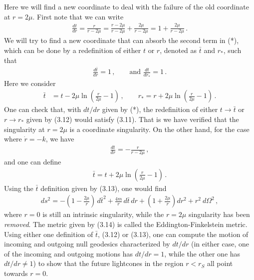 \documentclass[11pt, onesided]{book}
\theoremstyle{break}
\theoremstyle{break}
\begin{document}
Here we will find a new coordinate to deal with the failure of the old coordinate at $r = 2\mu $. First note that we can write
\begin{align*}
\frac{dt}{dr}  = \frac{r}{r-2\mu } = \frac{r-2\mu }{r-2\mu }+\frac{2\mu }{r-2\mu } = 1 + \frac{2\mu }{r- 2\mu }\,. \tag{*}
\end{align*}
We will try to find a new coordinate that can absorb the second term in (*), which can be done by a redefinition of either $t$ or $r$, denoted as $\bar{t}$ and $r_*$, such that
\begin{align}
\frac{d\bar{t}}{dr} = 1\,,\qquad\text{and }\frac{dt}{dr_*} = 1\,.
\end{align} 
Here we consider
\begin{align}
\bar{t} &= t - 2\mu \ln\left( \frac{r}{2\mu } - 1\right) \,,\qquad
r_* = r + 2\mu  \ln\left( \frac{r}{2\mu }-1\right)\,.
\end{align}
One can check that, with $dt/dr$ given by (*), the redefinition of either $t\to \bar{t}$ or $r \to r_*$ given by (3.12) would satisfy (3.11). That is we have verified that the singularity at $r = 2\mu $ is a coordinate singularity. On the other hand, for the case where $\dot{r} = -k$, we have
\begin{align*}
\frac{dt}{dr} = -\frac{r}{r - 2\mu }\,,
\end{align*} 
and one can define
\begin{align}
\bar{t} = t + 2\mu  \ln \left( \frac{r}{2\mu } - 1\right)\,.
\end{align}
Using the $\bar{t}$ definition given by (3.13), one would find
\begin{align}
ds^2 = -\left( 1 - \frac{2\mu }{r}\right) \, d\bar{t}^2 + \frac{4m}{r}\, d\bar{t}\, dr + \left( 1 + \frac{2\mu }{r}\right) dr^2 + r^2 \ d\Omega^2\,,
\end{align}
where $r = 0$ is still an intrinsic singularity, while the $r = 2\mu $ singularity has been \textit{removed}. The metric given by (3.14) is called the Eddington-Finkelstein metric. \\ 

Using either one definition of $\bar{t}$, (3.12) or (3.13), one can compute the motion of incoming and outgoing null geodesics characterized by $dt/dr$ (in either case, one of the incoming and outgoing motions has $dt/dr = 1$, while the other one has $dt/dr\neq 1$) to show that the future lightcones in the region $r<r_S$ all point towards $r = 0$. \\
\end{document}
